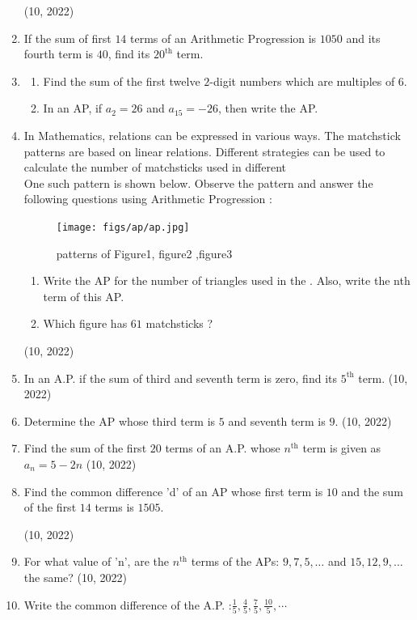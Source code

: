 \begin{enumerate}[label=\thesubsection.\arabic*,ref=\thesubsection.\theenumi,itemsep=1pt]
        \hfill (10,  2022) \item If the sum of first $14$ terms of an Arithmetic Progression is $1050$ and its fourth term is $40$, find its $20^{\text{th}}$ term.

     \item 
    \begin{enumerate}
         \item Find the sum of the first twelve $2$-digit numbers which are 
multiples of $6$.

         \item In an AP, if $a_2=26$ and $a _ {15} = -26$, then write the AP.
        \end{enumerate}
         \item In Mathematics, relations can be expressed in various ways. The 
matchstick patterns are based on linear relations. Different strategies 
can be used to calculate the number of matchsticks used in different 
 \\One such pattern is shown below. Observe the pattern and answer the 
following questions using Arithmetic Progression :
\begin{figure}[H]
    \centering
	\texttt{[image: figs/ap/ap.jpg]}
	\caption{patterns of Figure1, figure2 ,figure3}
    \label{fig:ap}
\end{figure}
    \begin{enumerate}
	 \item Write the AP for the number of triangles used in the . Also, 
write the nth term of this AP.
 \item Which figure has $61$ matchsticks ? 
    \end{enumerate} 

    \hfill (10,  2022) 
 \item In an A.P. if the sum of third and seventh term is zero, find its $5^{\text{th}}$ term.
        \hfill (10,  2022)
  \item Determine the AP whose third term is $5$ and seventh term is $9$.
        \hfill (10,  2022) \item Find the sum of the first $20$ terms of an A.P. whose $n^{\text{th}}$ term is given as $a_n=5-2n$
        \hfill (10,  2022) \item Find the common difference 'd' of an AP whose first term is $10$ and the sum of the first $14$ terms is $1505$.

        \hfill (10,  2022) \item For what value of 'n', are the $n^{\text{th}}$ terms of the APs: $9,7,5,\dots$ and $15,12,9,\dots$ the same?
    \hfill (10,  2022)
	 \item Write the common difference of the A.P. :$\frac{1}{5}, \frac{4}{5}, \frac{7}{5}, \frac{10}{5}, \cdots$


\end{enumerate}
